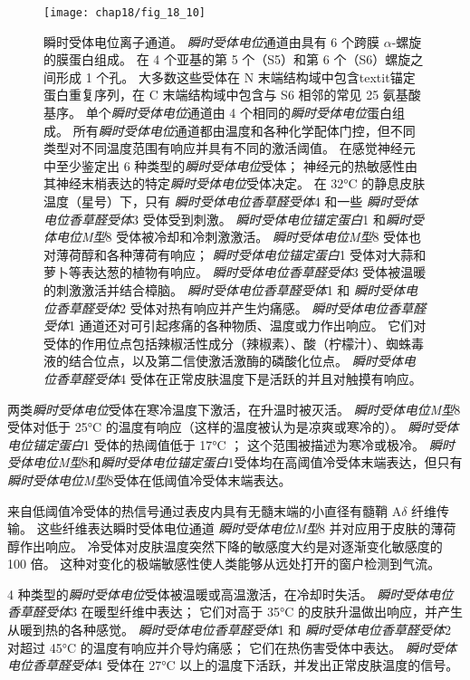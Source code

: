 \begin{figure}[htbp]
	\centering
	\texttt{[image: chap18/fig\_18\_10]}
	\caption{瞬时受体电位离子通道。
		\textit{瞬时受体电位}通道由具有 6 个跨膜 $\alpha$-螺旋的膜蛋白组成。
		在 4 个亚基的第 5 个（S5）和第 6 个（S6）螺旋之间形成 1 个孔。
		大多数这些受体在 N 末端结构域中包含textit{锚定蛋白}重复序列，在 C 末端结构域中包含与 S6 相邻的常见 25 氨基酸基序。
		单个\textit{瞬时受体电位}通道由 4 个相同的\textit{瞬时受体电位}蛋白组成。
		所有\textit{瞬时受体电位}通道都由温度和各种化学配体门控，但不同类型对不同温度范围有响应并具有不同的激活阈值。
		在感觉神经元中至少鉴定出 6 种类型的\textit{瞬时受体电位}受体； 神经元的热敏感性由其神经末梢表达的特定\textit{瞬时受体电位}受体决定。
		在 32°C 的静息皮肤温度（星号）下，只有 \textit{瞬时受体电位香草醛受体}4 和一些 \textit{瞬时受体电位香草醛受体}3 受体受到刺激。
		\textit{瞬时受体电位锚定蛋白}1 和\textit{瞬时受体电位M型}8 受体被冷却和冷刺激激活。
		\textit{瞬时受体电位M型}8 受体也对薄荷醇和各种薄荷有响应；
		\textit{瞬时受体电位锚定蛋白}1 受体对大蒜和萝卜等表达葱的植物有响应。
		\textit{瞬时受体电位香草醛受体}3 受体被温暖的刺激激活并结合樟脑。
		\textit{瞬时受体电位香草醛受体}1 和 \textit{瞬时受体电位香草醛受体}2 受体对热有响应并产生灼痛感。 
		\textit{瞬时受体电位香草醛受体}1 通道还对可引起疼痛的各种物质、温度或力作出响应。
		它们对受体的作用位点包括辣椒活性成分（辣椒素）、酸（柠檬汁）、蜘蛛毒液的结合位点，以及第二信使激活激酶的磷酸化位点。
		\textit{瞬时受体电位香草醛受体}4 受体在正常皮肤温度下是活跃的并且对触摸有响应\cite{jordt2003lessons}。}
	\label{fig:18_10}
\end{figure}


两类\textit{瞬时受体电位}受体在寒冷温度下激活，在升温时被灭活。
\textit{瞬时受体电位M型}8 受体对低于 25°C 的温度有响应（这样的温度被认为是凉爽或寒冷的）。
\textit{瞬时受体电位锚定蛋白}1 受体的热阈值低于 17°C ；
这个范围被描述为寒冷或极冷。
\textit{瞬时受体电位M型}8和\textit{瞬时受体电位锚定蛋白}1受体均在高阈值冷受体末端表达，但只有\textit{瞬时受体电位M型}8受体在低阈值冷受体末端表达。


来自低阈值冷受体的热信号通过表皮内具有无髓末端的小直径有髓鞘 A$\delta$ 纤维传输。
这些纤维表达瞬时受体电位通道 \textit{瞬时受体电位M型}8 并对应用于皮肤的薄荷醇作出响应。
冷受体对皮肤温度突然下降的敏感度大约是对逐渐变化敏感度的 100 倍。
这种对变化的极端敏感性使人类能够从远处打开的窗户检测到气流。


4 种类型的\textit{瞬时受体电位}受体被温暖或高温激活，在冷却时失活。
\textit{瞬时受体电位香草醛受体}3 在暖型纤维中表达；
它们对高于 35°C 的皮肤升温做出响应，并产生从暖到热的各种感觉。
\textit{瞬时受体电位香草醛受体}1 和 \textit{瞬时受体电位香草醛受体}2 对超过 45°C 的温度有响应并介导灼痛感；
它们在热伤害受体中表达。 
\textit{瞬时受体电位香草醛受体}4 受体在 27°C 以上的温度下活跃，并发出正常皮肤温度的信号。


